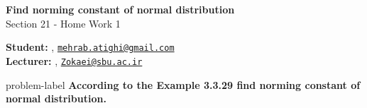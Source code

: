 	






		\begin{Large}
		\textsf{\textbf{Find norming constant of normal distribution}}\\
		Section 21 - Home Work 1
	\end{Large}
	
	\vspace{1ex}
	
	\textsf{\textbf{Student:}} , \href{mailto:mehrab.atighi@gmail.com}{\texttt{mehrab.atighi@gmail.com}}\\
	\textsf{\textbf{Lecturer:}} , \href{mailto:Zokaei@sbu.ac.ir}{\texttt{Zokaei@sbu.ac.ir}}
	
	
	\vspace{2ex}
	
	\begin{problem}{}{problem-label}
				\textbf{According to the Example 3.3.29 find norming constant of normal distribution.}
				\cite{Embrechts.etal1997}
	\end{problem}
	

